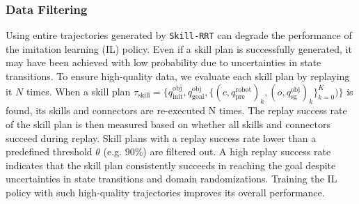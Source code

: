 
%






\subsubsection{Data Filtering}

Using entire trajectories generated by \texttt{Skill-RRT} can degrade the performance of the imitation learning (IL) policy. Even if a skill plan is successfully generated, it may have been achieved with low probability due to uncertainties in state transitions. To ensure high-quality data, we evaluate each skill plan by replaying it $N$ times. When a skill plan $\tau_\text{skill}=\{ q^{\text{obj}}_{\text{init}}, q^{\text{obj}}_{\text{goal}}, \{(c,q^{\text{robot}}_{\text{pre}})_k, (o,q^{\text{obj}}_{\text{sg}})_k\}_{k=0}^K) \}$ is found, its skills and connectors are re-executed N times. The replay success rate of the skill plan is then measured based on whether all skills and connectors succeed during replay. Skill plans with a replay success rate lower than a predefined threshold $\theta$ (e.g. 90\%) are filtered out. A high replay success rate indicates that the skill plan consistently succeeds in reaching the goal despite uncertainties in state transitions and domain randomizations. Training the IL policy with such high-quality trajectories improves its overall performance.



